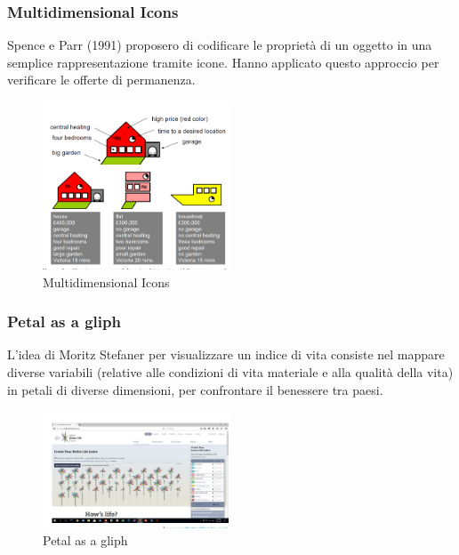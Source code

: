 \subsubsection{Multidimensional Icons}
Spence e Parr (1991) proposero di codificare le proprietà di un oggetto in una semplice rappresentazione tramite icone. 
Hanno applicato questo approccio per verificare le offerte di permanenza.
\begin{figure}[H]
    \centering
    \includegraphics[width=0.5\textwidth]{images/MultiIcon.png} 
    \caption{Multidimensional Icons}
    \label{fig:immagine}
\end{figure}
\subsubsection{Petal as a gliph}
L'idea di Moritz Stefaner per visualizzare un indice di vita consiste nel mappare diverse variabili (relative alle condizioni di vita materiale e alla qualità della vita) in petali di diverse dimensioni, per confrontare il benessere tra paesi.
\begin{figure}[H]
    \centering
    \includegraphics[width=0.5\textwidth]{images/PetalGliph.png} 
    \caption{Petal as a gliph}
    \label{fig:immagine}
\end{figure}
